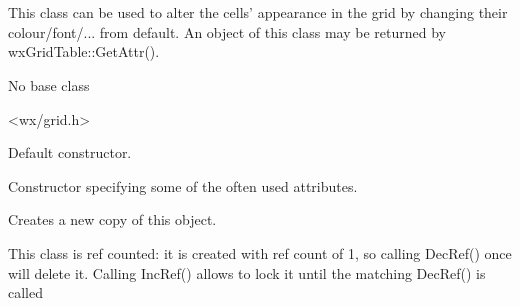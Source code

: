 %
%

\section{}\label{wxgridcellattr}

This class can be used to alter the cells' appearance in
the grid by changing their colour/font/... from default. An object of this
class may be returned by wxGridTable::GetAttr().


No base class


<wx/grid.h>




\label{wxgridcellattrwxgridcellattr}


Default constructor.


Constructor specifying some of the often used attributes.


\label{wxgridcellattrclone}


Creates a new copy of this object.


\label{wxgridcellattrincref}


This class is ref counted: it is created with ref count of 1, so
calling DecRef() once will delete it. Calling IncRef() allows to lock
it until the matching DecRef() is called


\label{wxgridcellattrdecref}


\label{wxgridcellattrsettextcolour}


